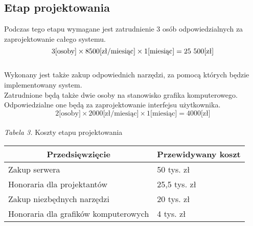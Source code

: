 \documentclass 	[11pt, a4paper, leqno]	{article}					%
\begin{document}
\subsection{Etap projektowania}
\noindent
Podczas tego etapu wymagane jest zatrudnienie 3 osób odpowiedzialnych za zaprojektowanie całego systemu. \\
\begin{equation}3 \text{[osoby]} \times  8500 \text{[zł/miesiąc]} \times 1 \text{[miesiąc]} = 25\\\ 500 \text{[zł]} \end{equation} \\
Wykonany jest także zakup odpowiednich narzędzi, za pomocą których będzie implementowany system.  \\
Zatrudnione będą także dwie osoby na stanowisko grafika komputerowego. Odpowiedzialne one będą za zaprojektowanie interfejsu użytkownika. \\
\begin{equation}2 \text{[osoby]} \times 2000 \text{[zł/miesiąc]} \times 1 \text{[miesiąc]} = 4000 \text{[zł]} \end{equation} \\
\textit{Tabela 3.} Koszty etapu projektowania

\begin{center}
	\begin{tabular}{| l | l |}
		\hline
		\multicolumn{1}{|c|}{Przedsięwzięcie} & 
		\multicolumn{1}{|c|}{Przewidywany koszt} \\ \hline \hline
		Zakup serwera & 50 tys. zł \\ \hline
		Honoraria dla projektantów & 25,5 tys. zł \\ \hline
		Zakup niezbędnych narzędzi & 20 tys. zł \\ \hline
		Honoraria dla grafików komputerowych & 4 tys. zł \\ \hline
	\end{tabular}
\end{center}
\end{document}
